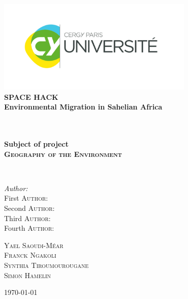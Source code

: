 \begin{titlepage}
\begin{center}

\includegraphics[width=0.7\textwidth]{./logo_cyu}~\\[1cm]

{\huge \bfseries SPACE HACK\\[0.4cm]
Environmental Migration in Sahelian Africa\\}

\textsc{\Large }\\[0.5cm]

\HRule \\[0.4cm]

{\huge \bfseries Subject of project\\[0.4cm]
\textsc{Geography of the Environment}\\[0.4cm]}

\HRule \\[1.5cm]

\begin{minipage}{0.4\textwidth}
\begin{flushleft} \large
\emph{Author:}\\
First \textsc{Author:}\\
Second \textsc{Author:}\\
Third \textsc{Author:}\\
Fourth \textsc{Author:}
\end{flushleft}
\end{minipage}
\begin{minipage}{0.4\textwidth}
\begin{flushright} \large
\textsc{Yael Saoudi-Méar} \\
\textsc{Franck Ngakoli}\\
\textsc{Synthia Tiroumourougane}\\
\textsc{Simon Hamelin}\\
\end{flushright}
\end{minipage}

\vfill

{\large \today}

\end{center}
\end{titlepage}